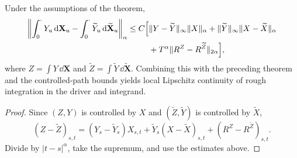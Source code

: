 \begin{cor}
Under the assumptions of the theorem,
\begin{align*}
\left\|\int_0^\cdot Y_u\,\mathrm{d}\mathbf X_u
      -\int_0^\cdot\widetilde Y_u\,\mathrm{d}\widetilde{\mathbf X}_u\right\|_\alpha
\le C\Bigl[&
 \|Y-\widetilde Y\|_\infty\|X\|_\alpha
 +\|\widetilde Y\|_\infty\|X-\widetilde X\|_\alpha\\
 &+T^\alpha\|R^Z-R^{\widetilde Z}\|_{2\alpha}
\Bigr],
\end{align*}
where $Z=\int Y\,\dd\mathbf X$ and
$\widetilde Z=\int\widetilde Y\,\dd\widetilde{\mathbf X}$.  Combining this
with the preceding theorem and the controlled-path bounds yields local
Lipschitz continuity of rough integration in the driver and integrand.
\end{cor}

\begin{proof}
Since $(Z,Y)$ is controlled by $X$ and $(\widetilde Z,\widetilde Y)$ is
controlled by $\widetilde X$,
\[
  (Z-\widetilde Z)_{s,t}
  =(Y_s-\widetilde Y_s)X_{s,t}
   +\widetilde Y_s(X-\widetilde X)_{s,t}
   +(R^Z-R^{\widetilde Z})_{s,t}.
\]
Divide by $|t-s|^\alpha$, take the supremum, and use the estimates above.
\end{proof}
